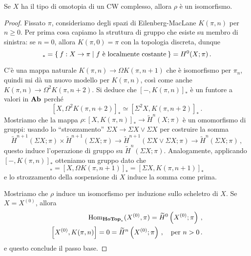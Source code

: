 	\begin{thm}
		Se $X$ ha il tipo di omotopia di un CW complesso,
		allora $\rho$ è un isomorfismo.
		\begin{proof}
			Fissato $\pi$, consideriamo degli spazi di Eilenberg-MacLane
			$K(\pi,n)$ per $n \ge 0$. Per prima cosa capiamo
			la struttura di gruppo che esiste su membro di sinistra:%
			se $n=0$, allora $K(\pi,0)=\pi$ con la topologia discreta, dunque
			\begin{equation*}
				[X,K(\pi,0)]_{\ast} = \Set{f:X \to \pi | f \text{ è localmente costante} }
				= H^{0}(X;\pi)\,.
			\end{equation*}
			
			C'è una mappa naturale $K(\pi,n) \to \Omega K(\pi,n+1)$
			che è isomorfismo per $\pi_{n}$, quindi mi dà un nuovo modello per $K(\pi,n)$,
			così come anche $K(\pi,n) \to\Omega^{2} K(\pi, n+2)$.
			Si deduce che $[-,K(\pi,n)]_{\ast}$ è un funtore a valori in ${\normalfont\textbf{Ab}}$
			perché
			\begin{equation*}
				\left[X,\Omega^{2}K(\pi,n+2)\right]_{\ast} \simeq 
				\left[\Sigma^{2} X, K(\pi,n+2)\right]_{\ast}\,.
			\end{equation*}
			Mostriamo che la mappa $\rho: [X,K(\pi,n)]_{\ast} \to \widetilde{H}^{n}(X;\pi)$ 
			è un omomorfismo di gruppi: 
			usando lo ``strozzamento'' $\Sigma X \to \Sigma X \vee \Sigma X$
			per costruire la somma
		\begin{equation*}
			\widetilde{H}^{n+1}(\Sigma X;\pi) \times \widetilde{H}^{n+1}(\Sigma X;\pi)
			\longrightarrow \widetilde{H}^{n+1}(\Sigma X \vee \Sigma X;\pi)
			\longrightarrow \widetilde{H}^{n}(\Sigma X;\pi)\,,
		\end{equation*}
		questo induce l'operazione di gruppo su $\widetilde{H}^{n}(\Sigma X;\pi)$.
		Analogamente, applicando $[-,K(\pi,n)]_{\ast}$ otteniamo un gruppo dato che
		\begin{equation*}
			[X,K(\pi,n)]_{\ast} = [X,\Omega K(\pi,n+1)]_{\ast} = [\Sigma X,K(\pi,n+1)]_{\ast}
		\end{equation*}
		e lo strozzamento della sospensione di $X$ induce la somma come prima.
		
		Mostriamo che $\rho$ induce un isomorfismo per induzione sullo scheletro di $X$.
		Se $X=X^{(0)}$, allora
		\begin{align*}
			\operatorname{Hom}_{{\normalfont\textbf{HoTop}}_{\ast}}(X^{(0)},\pi) = \widetilde{H}^{0}\left(X^{(0)};\pi\right)\,, \\
			\left[ X^{(0)}, K(\pi,n) \right] = 0 
			= \widetilde{H}^{n}\left(X^{(0)};\pi\right)\,, \quad \text{per } n>0\,.
		\end{align*}
		e questo conclude il passo base. 
		

\end{proof}
\end{thm}
